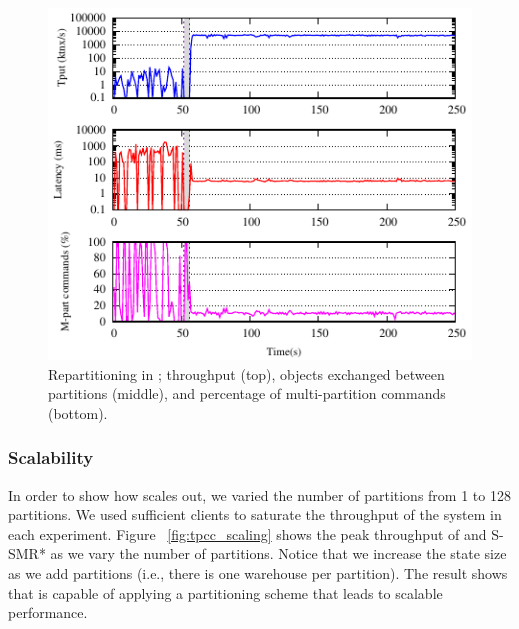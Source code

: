 \begin{figure}[ht!]
  \centering
    \includegraphics[width=0.8\columnwidth]{figures/experiments/dynastar/tpcc-detail-dynastar}
  \caption{Repartitioning in \dynastar; throughput (top), objects exchanged between partitions (middle),
  and percentage of multi-partition commands (bottom).}
  \label{fig:tpcc_repartitioning}
\end{figure}

\subsubsection{Scalability}
In order to show how \dynastar scales out, we varied the number of partitions from 1 to 128 partitions.
We used sufficient clients to  saturate the throughput of the system in each experiment.
Figure ~\ref{fig:tpcc_scaling} shows the peak throughput of \dynastar and S-SMR* as we vary the
number of partitions.
Notice that we increase the state size as we add partitions (i.e., there is one warehouse per partition).
The result shows that \dynastar is capable of applying
a partitioning scheme that leads to scalable performance.

